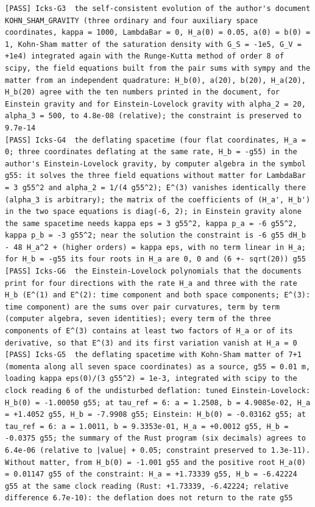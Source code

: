 \documentclass[
  10pt,
]{article}
\begin{document}
\begin{verbatim}
[PASS] Icks-G3  the self-consistent evolution of the author's document KOHN_SHAM_GRAVITY (three ordinary and four auxiliary space coordinates, kappa = 1000, LambdaBar = 0, H_a(0) = 0.05, a(0) = b(0) = 1, Kohn-Sham matter of the saturation density with G_S = -1e5, G_V = +1e4) integrated again with the Runge-Kutta method of order 8 of scipy, the field equations built from the pair sums with sympy and the matter from an independent quadrature: H_b(0), a(20), b(20), H_a(20), H_b(20) agree with the ten numbers printed in the document, for Einstein gravity and for Einstein-Lovelock gravity with alpha_2 = 20, alpha_3 = 500, to 4.8e-08 (relative); the constraint is preserved to 9.7e-14
[PASS] Icks-G4  the deflating spacetime (four flat coordinates, H_a = 0; three coordinates deflating at the same rate, H_b = -g55) in the author's Einstein-Lovelock gravity, by computer algebra in the symbol g55: it solves the three field equations without matter for LambdaBar = 3 g55^2 and alpha_2 = 1/(4 g55^2); E^(3) vanishes identically there (alpha_3 is arbitrary); the matrix of the coefficients of (H_a', H_b') in the two space equations is diag(-6, 2); in Einstein gravity alone the same spacetime needs kappa eps = 3 g55^2, kappa p_a = -6 g55^2, kappa p_b = -3 g55^2; near the solution the constraint is -6 g55 dH_b - 48 H_a^2 + (higher orders) = kappa eps, with no term linear in H_a; for H_b = -g55 its four roots in H_a are 0, 0 and (6 +- sqrt(20)) g55
[PASS] Icks-G6  the Einstein-Lovelock polynomials that the documents print for four directions with the rate H_a and three with the rate H_b (E^(1) and E^(2): time component and both space components; E^(3): time component) are the sums over pair curvatures, term by term (computer algebra, seven identities); every term of the three components of E^(3) contains at least two factors of H_a or of its derivative, so that E^(3) and its first variation vanish at H_a = 0
[PASS] Icks-G5  the deflating spacetime with Kohn-Sham matter of 7+1 (momenta along all seven space coordinates) as a source, g55 = 0.01 m, loading kappa eps(0)/(3 g55^2) = 1e-3, integrated with scipy to the clock reading 6 of the undisturbed deflation: tuned Einstein-Lovelock: H_b(0) = -1.00050 g55; at tau_ref = 6: a = 1.2508, b = 4.9085e-02, H_a = +1.4052 g55, H_b = -7.9908 g55; Einstein: H_b(0) = -0.03162 g55; at tau_ref = 6: a = 1.0011, b = 9.3353e-01, H_a = +0.0012 g55, H_b = -0.0375 g55; the summary of the Rust program (six decimals) agrees to 6.4e-06 (relative to |value| + 0.05; constraint preserved to 1.3e-11). Without matter, from H_b(0) = -1.001 g55 and the positive root H_a(0) = 0.01147 g55 of the constraint: H_a = +1.73339 g55, H_b = -6.42224 g55 at the same clock reading (Rust: +1.73339, -6.42224; relative difference 6.7e-10): the deflation does not return to the rate g55
\end{verbatim}
\end{document}
